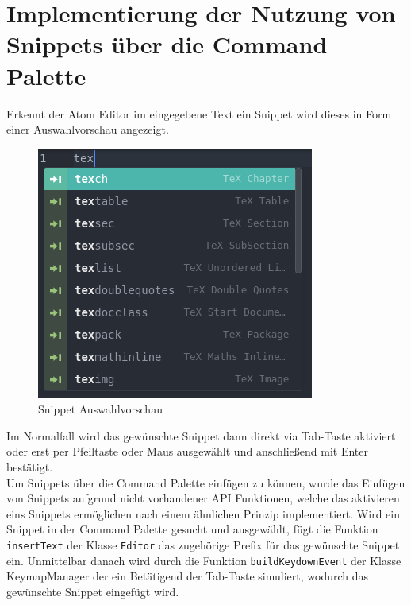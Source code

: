     \section{Implementierung der Nutzung von Snippets über die Command Palette}
        Erkennt der Atom Editor im eingegebene Text ein Snippet wird dieses in Form einer Auswahlvorschau angezeigt.
        \begin{figure}[H]
            \centering
            \includegraphics[scale=0.5]{img/snippet_preview.png}
            \caption{Snippet Auswahlvorschau}
        \end{figure}
        Im Normalfall wird das gewünschte Snippet dann direkt via Tab-Taste aktiviert oder erst per Pfeiltaste oder Maus ausgewählt und anschließend mit Enter bestätigt.
        \\
        Um Snippets über die Command Palette einfügen zu können, wurde das Einfügen von Snippets aufgrund nicht vorhandener API Funktionen, welche das aktivieren eins Snippets ermöglichen nach einem ähnlichen Prinzip implementiert. Wird ein Snippet in der Command Palette gesucht und ausgewählt, fügt die Funktion \texttt{insertText} der Klasse \texttt{Editor} das zugehörige Prefix für das gewünschte Snippet ein. Unmittelbar danach wird durch die Funktion \texttt{buildKeydownEvent} der Klasse KeymapManager der ein Betätigend der Tab-Taste simuliert, wodurch das gewünschte Snippet eingefügt wird.

